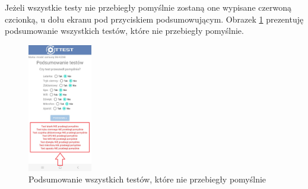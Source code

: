 \newpage


Jeżeli wszystkie testy nie przebiegły pomyślnie zostaną one wypisane czerwoną czcionką, u dołu ekranu pod przyciskiem podsumowującym.
\newline
Obrazek \ref{rys:wyniki2} prezentuję podsumowanie wszystkich testów, które nie przebiegły pomyślnie.

\begin{figure}[!hbt]
	\begin{center}
		\includegraphics[angle=360, width=0.25\textwidth]{rys/punkt6/wyniki2}
		\caption{Podsumowanie wszystkich testów, które nie przebiegły pomyślnie}
		\label{rys:wyniki2}
	\end{center}
\end{figure}


















